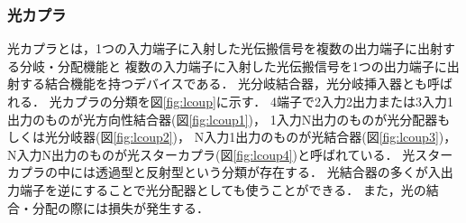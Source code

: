 \subsubsection{光カプラ}
光カプラとは，1つの入力端子に入射した光伝搬信号を複数の出力端子に出射する分岐・分配機能と
複数の入力端子に入射した光伝搬信号を1つの出力端子に出射する結合機能を持つデバイスである．
光分岐結合器，光分岐挿入器とも呼ばれる．
光カプラの分類を図\ref{fig:lcoup}に示す．
4端子で2入力2出力または3入力1出力のものが光方向性結合器(図\ref{fig:lcoup1})，
1入力N出力のものが光分配器もしくは光分岐器(図\ref{fig:lcoup2})，
N入力1出力のものが光結合器(図\ref{fig:lcoup3})，
N入力N出力のものが光スターカプラ(図\ref{fig:lcoup4})と呼ばれている．
光スターカプラの中には透過型と反射型という分類が存在する．
光結合器の多くが入出力端子を逆にすることで光分配器としても使うことができる\cite{ハンドブック}．
また，光の結合・分配の際には損失が発生する．

